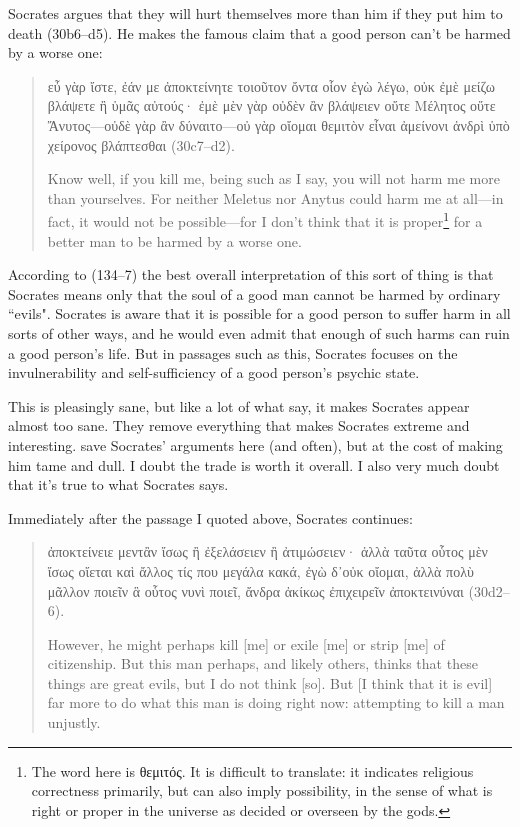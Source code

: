 \documentclass[11pt]{article}
\begin{document}
Socrates argues that they will hurt themselves more than him if they put him to death (30b6--d5).  He makes the famous claim that a good person can't be harmed by a worse one:

\begin{quote}
    {\g εὖ γὰρ ἴστε, ἐάν με ἀποκτείνητε τοιοῦτον ὄντα οἷον ἐγὼ λέγω, οὐκ ἐμὲ μείζω βλάψετε ἢ ὑμᾶς αὐτούς· ἐμὲ μὲν γὰρ οὐδὲν ἂν βλάψειεν οὔτε Μέλητος οὔτε Ἄνυτος---οὐδὲ γὰρ ἂν δύναιτο---οὐ γὰρ οἴομαι θεμιτὸν εἶναι ἀμείνονι ἀνδρὶ ὑπὸ χείρονος βλάπτεσθαι} (30c7--d2).

    Know well, if you kill me, being such as I say, you will not harm me more than yourselves. For neither Meletus nor Anytus could harm me at all---in fact, it would not be possible---for I don't think that it is proper\footnote{The word here is {\g θεμιτός}.  It is difficult to translate: it indicates religious correctness primarily, but can also imply possibility, in the sense of what is right or proper in the universe as decided or overseen by the gods.} for a better man to be harmed by a worse one.
\end{quote}

According to \citet{brickhouse2004} (134--7) the best overall interpretation of this sort of thing is that Socrates means only that the soul of a good man cannot be harmed by ordinary ``evils".  Socrates is aware that it is possible for a good person to suffer harm in all sorts of other ways, and he would even admit that enough of such harms can ruin a good person's life.  But in passages such as this, Socrates focuses on the invulnerability and self-sufficiency of a good person's psychic state.

This is pleasingly sane, but like a lot of what \citeauthor{brickhouse2004} say, it makes Socrates appear almost too sane.  They remove everything that makes Socrates extreme and interesting.  \citeauthor{brickhouse2004} save Socrates' arguments here (and often), but at the cost of making him tame and dull.  I doubt the trade is worth it overall.  I also very much doubt that it's true to what Socrates says.

Immediately after the passage I quoted above, Socrates continues:

\begin{quote}
    {\g ἀποκτείνειε μεντἂν ἴσως ἢ ἐξελάσειεν ἢ ἀτιμώσειεν· ἀλλὰ ταῦτα οὗτος μὲν ἴσως οἴεται καὶ ἄλλος τίς που μεγάλα κακά, ἐγὼ δ᾽οὐκ οἴομαι, ἀλλὰ πολὺ μᾶλλον ποιεῖν ἃ οὗτος νυνὶ ποιεῖ, ἄνδρα ἀκίκως ἐπιχειρεῖν ἀποκτεινύναι} (30d2--6).

    However, he might perhaps kill [me] or exile [me] or strip [me] of citizenship. But this man perhaps, and likely others, thinks that these things are great evils, but I do not think [so]. But [I think that it is evil] far more to do what this man is doing right now: attempting to kill a man unjustly.
\end{quote}
\end{document}
